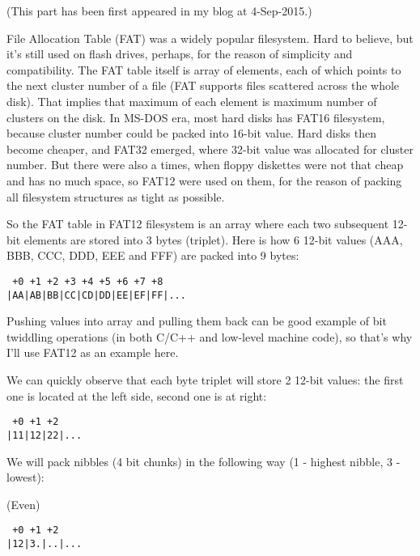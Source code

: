 
(This part has been first appeared in my blog at 4-Sep-2015.)


File Allocation Table (FAT) was a widely popular filesystem.
Hard to believe, but it's still used on flash drives, perhaps, for the reason of simplicity and compatibility.
The FAT table itself is array of elements, each of which points to the next cluster number of a file 
(FAT supports files scattered across the whole disk).
That implies that maximum of each element is maximum number of clusters on the disk.
In MS-DOS era, most hard disks has FAT16 filesystem, because cluster number could be packed into 16-bit value.
Hard disks then become cheaper, and FAT32 emerged, where 32-bit value was allocated for cluster number.
But there were also a times, when floppy diskettes were not that cheap and has no much space, so FAT12 were used on them,
for the reason of packing all filesystem structures as tight as possible.

So the FAT table in FAT12 filesystem is an array where each two subsequent 12-bit elements are stored into 3 bytes (triplet).
Here is how 6 12-bit values (AAA, BBB, CCC, DDD, EEE and FFF) are packed into 9 bytes:

\begin{lstlisting}
 +0 +1 +2 +3 +4 +5 +6 +7 +8
|AA|AB|BB|CC|CD|DD|EE|EF|FF|...
\end{lstlisting}

Pushing values into array and pulling them back can be good example of bit twiddling operations (in both C/C++ and low-level machine code),
so that's why I'll use FAT12 as an example here.


We can quickly observe that each byte triplet will store 2 12-bit values: the first one is located at the left side, second one is at right:

\begin{lstlisting}
 +0 +1 +2
|11|12|22|...
\end{lstlisting}

We will pack nibbles (4 bit chunks) in the following way (1 - highest nibble, 3 - lowest):

(Even)

\begin{lstlisting}
 +0 +1 +2
|12|3.|..|...
\end{lstlisting}

